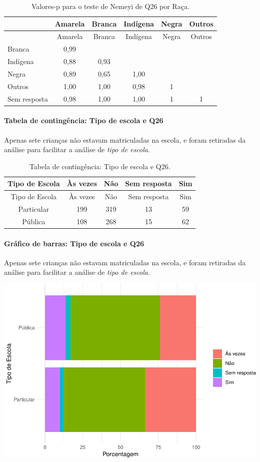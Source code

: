 \documentclass[]{article}
\let\oldparagraph\paragraph
\renewcommand{\paragraph}[1]{\oldparagraph{#1}\mbox{}}
\begin{document}
\begin{longtable}[]{@{}lccccc@{}}
\caption{\label{tab:unnamed-chunk-760}Valores-p para o teste de Nemeyi de Q26 por Raça.}\tabularnewline
\toprule
& Amarela & Branca & Indígena & Negra & Outros\tabularnewline
\midrule
\endfirsthead
\toprule
& Amarela & Branca & Indígena & Negra & Outros\tabularnewline
\midrule
\endhead
Branca & 0,99 & & & &\tabularnewline
Indígena & 0,88 & 0,93 & & &\tabularnewline
Negra & 0,89 & 0,65 & 1,00 & &\tabularnewline
Outros & 1,00 & 1,00 & 0,98 & 1 &\tabularnewline
Sem resposta & 0,98 & 1,00 & 1,00 & 1 & 1\tabularnewline
\bottomrule
\end{longtable}

\cleardoublepage

\hypertarget{tabela-de-continguxeancia-tipo-de-escola-e-q26}{%
\paragraph{Tabela de contingência: Tipo de escola e Q26}\label{tabela-de-continguxeancia-tipo-de-escola-e-q26}}

Apenas sete crianças não estavam matriculadas na escola, e foram retiradas da análise para facilitar a análise de \emph{tipo de escola}.

\begin{longtable}[]{@{}ccccc@{}}
\caption{\label{tab:unnamed-chunk-761}Tabela de contingência: Tipo de escola e Q26.}\tabularnewline
\toprule
Tipo de Escola & Às vezes & Não & Sem resposta & Sim\tabularnewline
\midrule
\endfirsthead
\toprule
Tipo de Escola & Às vezes & Não & Sem resposta & Sim\tabularnewline
\midrule
\endhead
Particular & 199 & 319 & 13 & 59\tabularnewline
Pública & 108 & 268 & 15 & 62\tabularnewline
\bottomrule
\end{longtable}

\hypertarget{gruxe1fico-de-barras-tipo-de-escola-e-q26}{%
\paragraph{Gráfico de barras: Tipo de escola e Q26}\label{gruxe1fico-de-barras-tipo-de-escola-e-q26}}

Apenas sete crianças não estavam matriculadas na escola, e foram retiradas da análise para facilitar a análise de \emph{tipo de escola}.

\begin{center}\includegraphics[width=0.75\linewidth]{relatorio_covid19_files/figure-latex/unnamed-chunk-762-1} \end{center}
\end{document}
